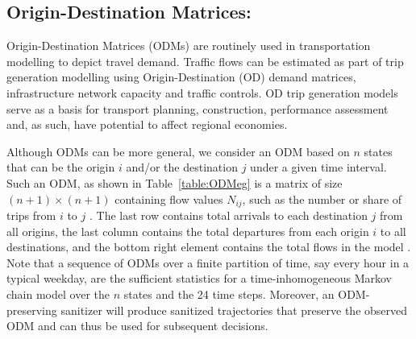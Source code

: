 \documentclass[times,twocolumn,final,authoryear]{elsarticle}
\begin{document}
\subsection{Origin-Destination Matrices:}
Origin-Destination Matrices (ODMs) are routinely used in transportation modelling to depict travel demand.  
Traffic flows can be estimated as part of trip generation modelling using Origin-Destination (OD) demand matrices, infrastructure network capacity and traffic controls. 
OD trip generation models serve as a basis for transport planning, construction, performance assessment and, as such, have potential to affect regional economies. 

Although ODMs can be more general, we consider an ODM based on $n$ states that can be the origin $i$ and/or the destination $j$ under a given time interval. 
Such an ODM, as shown in Table~\ref{table:ODMeg} is a matrix of size $(n+1) \times (n+1)$ containing flow values $N_{ij}$, such as the number or share of trips from $i$ to $j$ \citep{Rodrigue2009}.  
The last row contains total arrivals to each destination $j$ from all origins, the last column contains the total departures from each origin $i$ to all destinations, and the bottom right element contains the total flows in the model 
\citep{EVANS1970}. 
Note that a sequence of ODMs over a finite partition of time, say every hour in a typical weekday, are the sufficient statistics for a time-inhomogeneous Markov chain model over the $n$ states and the 24 time steps. 
Moreover, an ODM-preserving sanitizer will produce sanitized trajectories that preserve the observed ODM and can thus be used for subsequent decisions.

\begin{table}[]
\caption{An Origin Destination Matrix from a spatial interaction survey}
\centering

\label{table:ODMeg} 
\end{table}
\end{document}
